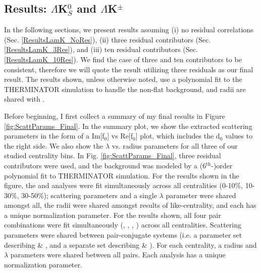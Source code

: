 \documentclass[../AnalysisNoteJBuxton.tex]{subfiles}
\begin{document}
\subsection{Results: \texorpdfstring{$\Lambda$K$^{0}_{S}$ and $\Lambda$K$^{\pm}$}{TEXT}}
\label{ResultsLamK}

In the following sections, we present results assuming (i) no residual correlations (Sec. \ref{ResultsLamK_NoRes}), (ii) three residual contributors (Sec. \ref{ResultsLamK_3Res}), and (iii) ten residual contributors (Sec. \ref{ResultsLamK_10Res}).  We find the case of three and ten contributors to be consistent, therefore we will quote the result utilizing three residuals as our final result.  The results shown, unless otherwise noted, use a polynomial fit to the THERMINATOR simulation to handle the non-flat background, and \LamKchPALamKchM radii are shared with \LamKchMALamKchP.


Before beginning, I first collect a summary of my final results in Figure \ref{fig:ScattParams_Final}.  In the summary plot, we show the extracted scattering parameters in the form of a Im[f$_{0}$] vs Re[f$_{0}$] plot, which includes the d$_{0}$ values to the right side.  We also show the $\lambda$ vs. radius parameters for all three of our studied centrality bins.  In Fig. \ref{fig:ScattParams_Final}, three residual contributors were used, and the background was modeled by a (6$^{\mathrm{th}}$-)order polynomial fit to THERMINATOR simulation.  For the \LamKs results shown in the figure, the \LamKs and \ALamKs analyses were fit simultaneously across all centralities (0-10\%, 10-30\%, 30-50\%); scattering parameters and a single $\lambda$ parameter were shared amongst all, the radii were shared amongst results of like-centrality, and each has a unique normalization parameter.  For the \LamKpm results shown, all four pair combinations were fit simultaneously (\LamKchP, \ALamKchM, \LamKchM, \ALamKchP) across all centralities.  Scattering parameters were shared between pair-conjugate systems (i.e. a parameter set describing \LamKchP \& \ALamKchM, and a separate set describing \LamKchM \& \ALamKchP).  For each centrality, a radius and $\lambda$ parameters were shared between all pairs.  Each analysis has a unique normalization parameter.
\end{document}
